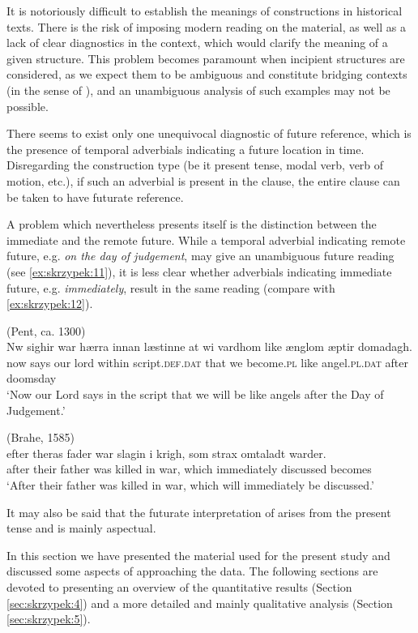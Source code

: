 \documentclass[output=paper,colorlinks,citecolor=brown]{langscibook}
\begin{document}
It is notoriously difficult to establish the meanings of constructions in historical texts. There is the risk of imposing modern reading on the material, as well as a lack of clear diagnostics in the context, which would clarify the meaning of a given structure. This problem becomes paramount when incipient structures are considered, as we expect them to be ambiguous and constitute bridging contexts (in the sense of \cite{Heine2002}), and an unambiguous analysis of such examples may not be possible. 

There seems to exist only one unequivocal diagnostic of future reference, which is the presence of temporal adverbials indicating a future location in time. Disregarding the construction type (be it present tense, modal verb, verb of motion, etc.), if such an adverbial is present in the clause, the entire clause can be taken to have futurate reference. 

A problem which nevertheless presents itself is the distinction between the immediate and the remote future. While a temporal adverbial indicating remote future, e.g. \textit{on the day of judgement}, may give an unambiguous future reading (see \ref{ex:skrzypek:11}), it is less clear whether adverbials indicating immediate future, e.g. \textit{immediately}, result in the same reading (compare with \ref{ex:skrzypek:12}). 

\ea \label{ex:skrzypek:11}
    (Pent, ca. 1300)\\
    \gll Nw sighir war hærra innan læstinne at wi vardhom like ænglom æptir domadagh.\\
    now says our lord within script.\textsc{def.dat} that we become.\textsc{pl} like angel.\textsc{pl.dat} after doomsday\\
    \glt ‘Now our Lord says in the script that we will be like angels after the Day of Judgement.’
\z

\ea \label{ex:skrzypek:12}
    (Brahe, 1585)\\
    \gll efter theras fader war slagin i krigh, som strax omtaladt warder.\\
    after their father was killed in war, which immediately discussed becomes\\
    \glt ‘After their father was killed in war, which will immediately be discussed.’
\z

It may also be said that the futurate interpretation of  arises from the present tense and is mainly aspectual.  

In this section we have presented the material used for the present study and discussed some aspects of approaching the data. The following sections are devoted to presenting an overview of the quantitative results (Section \ref{sec:skrzypek:4}) and a more detailed and mainly qualitative analysis (Section \ref{sec:skrzypek:5}). 
\end{document}

